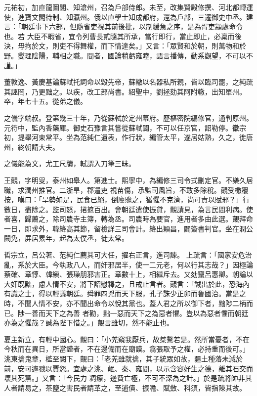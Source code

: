 \begin{pinyinscope}
 元祐初，加直龍圖閣、知滄州，召為戶部侍郎。未至，改集賢殿修撰、河北都轉運使，進寶文閣待制、知瀛州。俄以直學士知成都府，還為戶部，三遷御史中丞。建言：「朝廷事下六部，但隨省吏視其前後批，以制緩急之序，是為胥吏顓處命令也。若
 大臣不暇省，宜令列曹長貳隨其所承，當行即行，當止即止，必稟而後決，毋拘於文，則吏不得舞權，而下情達矣。」又言：「眾賢和於朝，則萬物和於野。燮理陰陽，輔相之職。間者，國論稍虧雍睦，語言播傳，動系觀望，不可以不謹。」



 董敦逸、黃慶基論蘇軾托詞命以毀先帝，蘇轍以名器私所親，皆以臨司罷，之純疏其誣罔，乃更黜之。以疾，改工部尚書。紹聖中，劉拯劾其阿附轍，出知單州。卒，年七十五。從弟之儀。



 之儀字端叔。登第幾三十年，乃從蘇軾於定州幕府。歷樞密院編修官，通判原州。元符中，監內香藥庫。御史石豫言其嘗從蘇軾闢，不可以任京官，詔勒停。徽宗初，提舉河東常平。坐為范純仁遺表，作行狀，編管太平，遂居姑熟，久之，徙唐州，終朝請大夫。



 之儀能為文，尤工尺牘，軾謂入刀筆三昧。



 王覿，字明叟，泰州如皋人。第進士。熙寧中，為編修三司令式刪定官。不樂久居職，求潤州推官。二浙旱，郡遣吏
 視苗傷，承監司風旨，不敢多除稅。覿受檄覆按，嘆曰：「旱勢如是，民食已絕，倒廩贍之，猶懼不克濟，尚可責以賦邪？」行數日，盡除之。監司怒，捃摭百出。會朝廷遣使振貸，覿請見，為言民間利病。使者喜，歸薦之，除司農寺主簿，轉為丞。司農時為要官，進用者多由此選。覿拜命一日，即求外，韓絳高其節，留檢詳三司會計。絳出穎昌，闢簽書判官。坐在潤公闕免，屏居累年，起為太僕丞，徙太常。



 哲宗立，呂公著、范純仁薦其可大任，擢右正言，進司諫。
 上疏言：「國家安危治亂，系於大臣。今執政八人，而奸邪居半，使一二元老，何以行其志哉？」因極論蔡確、章惇、韓縝、張璪朋邪害正。章數十上，相繼斥去。又劾竄呂惠卿。朝論以大奸既黜，慮人情不安，將下詔慰釋之，且戒止言者。覿言：「誠出於此，恐海內有識之士，得以輕議朝廷。舜罪四兇而天下服，孔子誅少正卯而魯國治。當是之時，不聞人情不安，亦不聞出命令以悅其黨也。蓋人君之所以御下者，黜陟二柄而已。陟一善而天下之為善
 者勸，黜一惡而天下之為惡者懼。豈以為惡者懼而朝廷亦為之懼哉？誠為陛下惜之。」覿言雖切，然不能止也。



 夏主新立，有輕中國心。覿曰：「小羌窺我厭兵，故桀驁若是。然所當憂者，不在今秋而在異日，所當謹者，不在邊備而在廟謨。翕張取予之權，必持重而後可。」洮東擒鬼章，檻至闕下，覿曰：「老羌雖就擒，其子統眾如故，疆土種落未減於前，安可遽戮以賈怨。宜處之洮、岷、秦、雍間，以示含容好生之德，離其石交而壞其死黨。」又言：「今民力
 凋瘵，邊費亡極，不可不深為之計。」於是疏將帥非其人者請易之，茶鹽之害民者請革之，至逋債、振瞻、賦斂、科須，皆指陳其故。




\end{pinyinscope}

